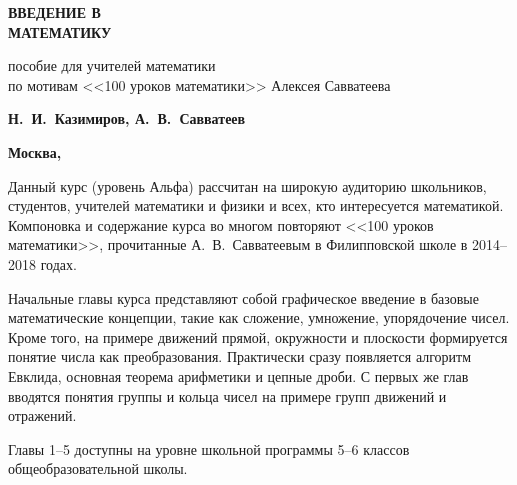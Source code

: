 {\thispagestyle{empty}


\begin{flushright}
\quad

\vspace{2cm}

{\fontsize{50pt}{0pt}\bfseries\sffamily ВВЕДЕНИЕ В\\[20pt] МАТЕМАТИКУ}


\vspace{2cm}

{\fontsize{20pt}{22pt}\sffamily пособие для учителей математики\\
по мотивам <<100 уроков математики>> Алексея Савватеева\\[5pt]
}

\vspace{2cm}

{\Large\bfseries\sffamily 	Н.~И.~Казимиров, А.~В.~Савватеев}

\vfill

{\Large\bfseries\sffamily 	Москва, \number\year}
\end{flushright}
}



\markboth{}{}

\clearpage
\renewcommand*\contentsname{\vspace{-20mm}\quad\hfill\Large\bfseries\sffamily\MakeUppercase{Содержание}\vspace{2mm}\textcolor{darkred}{\hrule}\thispagestyle{empty}}
\tableofcontents
 


Данный курс (уровень Альфа) рассчитан на широкую аудиторию школьников, студентов, учителей математики и физики и всех, кто интересуется математикой. Компоновка и содержание курса во многом повторяют <<100 уроков математики>>, прочитанные А.~В.~Савватеевым в Филипповской школе в 2014--2018 годах.

Начальные главы курса представляют собой графическое введение в базовые математические концепции, такие как сложение, умножение, упорядочение чисел. Кроме того, на примере движений прямой, окружности и плоскости формируется понятие числа как преобразования.
Практически сразу появляется алгоритм Евклида, основная теорема арифметики и цепные дроби.
С первых же глав вводятся понятия группы и кольца чисел на примере групп движений и отражений.

Главы 1--5 доступны на уровне школьной программы 5--6 классов общеобразовательной школы.

